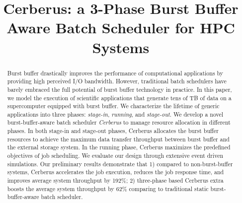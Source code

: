 \documentclass[10pt, conference,compsoc]{IEEEtran}
\begin{document}
%
\title{Cerberus: a 3-Phase Burst Buffer Aware Batch Scheduler for HPC Systems}


\author{
\and
{}
}




\maketitle

\begin{abstract}
Burst buffer drastically improves the performance of computational applications by providing high perceived I/O bandwidth.
However, traditional batch schedulers have barely embraced the full potential of burst buffer technology in practice. 
In this paper, we model the execution of scientific applications
that generate tens of TB of data on a supercomputer equipped with burst buffer.
We characterize the lifetime of generic applications into three phases:
\textit{stage-in}, \textit{running}, and \textit{stage-out}.
We develop a novel burst-buffer-aware batch scheduler \textit{Cerberus} to 
manage resource allocation in different phases.
In both stage-in and stage-out phases, Cerberus
allocates the burst buffer resources to achieve the maximum data transfer throughput
between burst buffer and the external storage system.
In the running phase, Cerberus maximizes the predefined objectives of job scheduling.
We evaluate our design through extensive event driven simulations. 
Our preliminary results demonstrate that
1) compared to non-burst-buffer systems, Cerberus accelerates the job execution, reduces the job response time, and improves average system throughput by 192\%;
2) three-phase based Cerberus extra boosts the average system throughput by 62\% comparing to traditional static burst-buffer-aware batch scheduler.
\end{abstract}
\end{document}
